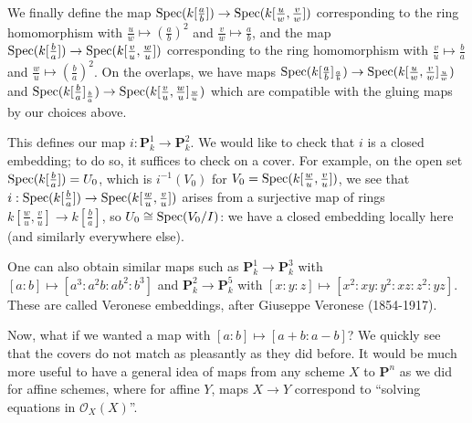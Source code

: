We finally define the map \(\operatorname{Spec}(k[\frac a b])\to \operatorname{Spec}(k[\frac u w,\frac v w])\) corresponding to the ring homomorphism with \(\frac u w \mapsto (\frac a b)^2\) and \(\frac v w\mapsto \frac a b\), and the map \(\operatorname{Spec}(k[\frac b a])\to \operatorname{Spec}(k[\frac v u,\frac w u])\) corresponding to the ring homomorphism with \(\frac v u \mapsto \frac b a\) and \(\frac w u \mapsto (\frac b a )^2\). On the overlaps, we have maps \(\operatorname{Spec}(k[\frac a b]_{\frac a b})\to \operatorname{Spec}(k[\frac u w,\frac v w]_{\frac u w})\) and \(\operatorname{Spec}(k[\frac b a ]_{\frac b a})\to \operatorname{Spec}(k[\frac v u, \frac w u]_{\frac w u})\) which are compatible with the gluing maps by our choices above. 

This defines our map \(i:\mathbf{P}^1_k\to \mathbf{P}^2_k\). We would like to check that \(i\) is a closed embedding; to do so, it suffices to check on a cover. For example, on the open set \(\operatorname{Spec}(k[\frac b a]) = U_0\), which is \(i^{-1}(V_0)\) for \(V_0 = \operatorname{Spec}(k[\frac w u, \frac v u])\), we see that \(i:\operatorname{Spec}(k[\frac b a])\to \operatorname{Spec}(k[\frac w u,\frac v u])\) arises from a surjective map of rings \(k[\frac w u,\frac v u]\to k[\frac b a]\), so \(U_0\cong \operatorname{Spec}(V_0/I)\): we have a closed embedding locally here (and similarly everywhere else). 

One can also obtain similar maps such as \(\mathbf{P}^1_k \to \mathbf{P}^3_k\) with \([a:b]\mapsto [a^3:a^2b:ab^2:b^3]\) and \(\mathbf{P}^2_k\to \mathbf{P}^5_k\) with \([x:y:z]\mapsto[x^2:xy:y^2:xz:z^2:yz]\). These are called Veronese embeddings, after Giuseppe Veronese (1854-1917). 


Now, what if we wanted a map with \([a:b]\mapsto[a+b:a-b]\)? We quickly see that the covers do not match as pleasantly as they did before. It would be much more useful to have a general idea of maps from any scheme \(X\) to \(\mathbf{P}^n\) as we did for affine schemes, where for affine \(Y\), maps \(X\to Y\) correspond to ``solving equations in \(\mathcal{O}_X(X)\)''. 


